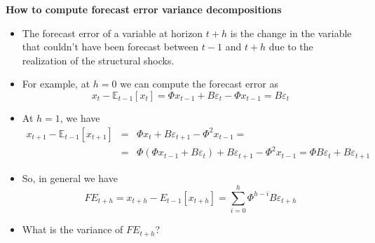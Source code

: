 \documentclass[10pt,english,t,aspectratio=169,ignorenonframetext]{beamer}
\begin{document}
\begin{frame}
{\textbf{How to compute {forecast error variance decompositions}}}

\begin{itemize}
\item The forecast error of a variable at horizon $t+h$ is the change in the
variable that couldn't have been forecast between $t-1$ and $t+h$ due to the
realization of the structural shocks.\bigskip

\item For example, at $h=0$ we can compute the forecast error as%
\begin{equation*}
x_{t}-\mathbb{E}_{t-1}[x_{t}]=\Phi x_{t-1}+B\varepsilon _{t}-\Phi
x_{t-1}=B\varepsilon _{t}
\end{equation*}

\item At $h=1$, we have 
\begin{eqnarray*}
x_{t+1}-\mathbb{E}_{t-1}[x_{t+1}] &=&\Phi x_{t}+B\varepsilon _{t+1}-\Phi
^{2}x_{t-1}= \\
&=&\Phi (\Phi x_{t-1}+B\varepsilon _{t})+B\varepsilon _{t+1}-\Phi
^{2}x_{t-1}=\Phi B\varepsilon _{t}+B\varepsilon _{t+1}
\end{eqnarray*}

\item So, in general we have 
\begin{equation*}
FE_{t+h}=x_{t+h}-E_{t-1}[x_{t+h}]=\sum_{i=0}^{h}\Phi ^{h-i}B\varepsilon
_{t+h}
\end{equation*}

\item What is the variance of $FE_{t+h}$?
\end{itemize}
\end{frame}

\end{document}
